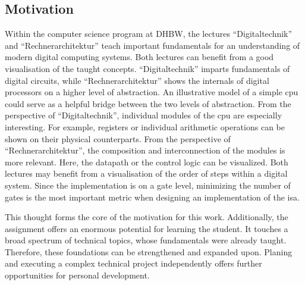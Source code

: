 \subsection{Motivation}

Within the computer science program at DHBW, the lectures ``Digitaltechnik'' and ``Rechnerarchitektur'' teach important fundamentals for an understanding of modern digital computing systems. Both lectures can benefit from a good visualisation of the taught concepts. ``Digitaltechnik'' imparts fundamentals of digital circuits, while ``Rechnerarchitektur'' shows the internals of digital processors on a higher level of abstraction. An illustrative model of a simple \ac{cpu} could serve as a helpful bridge between the two levels of abstraction. From the perspective of ``Digitaltechnik'', individual modules of the \ac{cpu} are especially interesting. For example, registers or individual arithmetic operations can be shown on their physical counterparts. From the perspective of ``Rechnerarchitektur'', the composition and interconnection of the modules is more relevant. Here, the datapath or the control logic can be visualized. Both lectures may benefit from a visualisation of the order of steps within a digital system. Since the implementation is on a gate level, minimizing the number of gates is the most important metric when designing an implementation of the \ac{isa}.

This thought forms the core of the motivation for this work. Additionally, the assignment offers an enormous potential for learning the student. It touches a broad spectrum of technical topics, whose fundamentals were already taught. Therefore, these foundations can be strengthened and expanded upon. Planing and executing a complex technical project independently offers further opportunities for personal development.